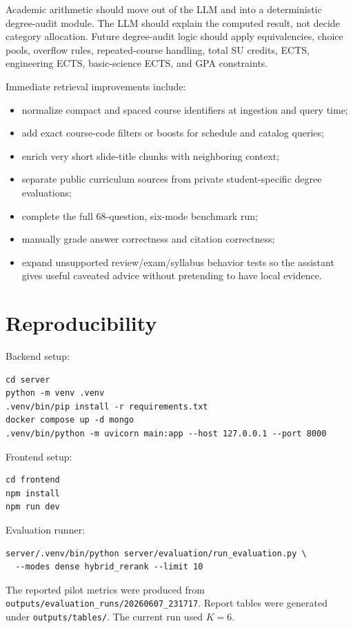 \documentclass[11pt]{article}
\begin{document}
Academic arithmetic should move out of the LLM and into a deterministic degree-audit module. The LLM should explain the computed result, not decide category allocation. Future degree-audit logic should apply equivalencies, choice pools, overflow rules, repeated-course handling, total SU credits, ECTS, engineering ECTS, basic-science ECTS, and GPA constraints.

Immediate retrieval improvements include:
\begin{itemize}
\setlength\itemsep{0.18em}
  \item normalize compact and spaced course identifiers at ingestion and query time;
  \item add exact course-code filters or boosts for schedule and catalog queries;
  \item enrich very short slide-title chunks with neighboring context;
  \item separate public curriculum sources from private student-specific degree evaluations;
  \item complete the full 68-question, six-mode benchmark run;
  \item manually grade answer correctness and citation correctness;
  \item expand unsupported review/exam/syllabus behavior tests so the assistant gives useful caveated advice without pretending to have local evidence.
\end{itemize}

\section{Reproducibility}
Backend setup:
\begin{verbatim}
cd server
python -m venv .venv
.venv/bin/pip install -r requirements.txt
docker compose up -d mongo
.venv/bin/python -m uvicorn main:app --host 127.0.0.1 --port 8000
\end{verbatim}

Frontend setup:
\begin{verbatim}
cd frontend
npm install
npm run dev
\end{verbatim}

Evaluation runner:
\begin{verbatim}
server/.venv/bin/python server/evaluation/run_evaluation.py \
  --modes dense hybrid_rerank --limit 10
\end{verbatim}

The reported pilot metrics were produced from \texttt{outputs/evaluation\_runs/20260607\_231717}. Report tables were generated under \texttt{outputs/tables/}. The current run used $K=6$.
\end{document}
